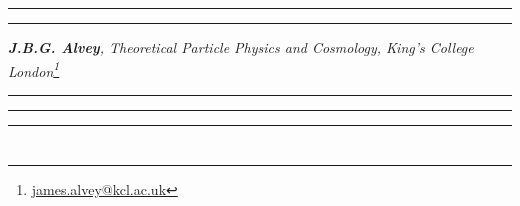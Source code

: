 \documentclass[10pt]{article}
\renewcommand*{\thefootnote}{\fnsymbol{footnote}}
\begin{document}
\hrule
\vspace{1pt}
\hrule
\begin{center}
\large\textsc{\color{darkblue}\textbf{}}
\vspace{5pt}

\footnotesize\textit{\textbf{J.B.G. Alvey}, Theoretical Particle Physics and Cosmology, King's College London\footnote{\href{mailto:james.alvey@kcl.ac.uk}{james.alvey@kcl.ac.uk}}}
\end{center}
\begin{abstract}
\noindent
\end{abstract}
\hrule
\tableofcontents
\vspace{5pt}
\hrule
\vspace{1pt}
\hrule
\vspace{10pt}
\renewcommand{\thefootnote}{\tiny\textbf{\arabic{section}.\arabic{footnote}}}
\section{}


\end{document}

